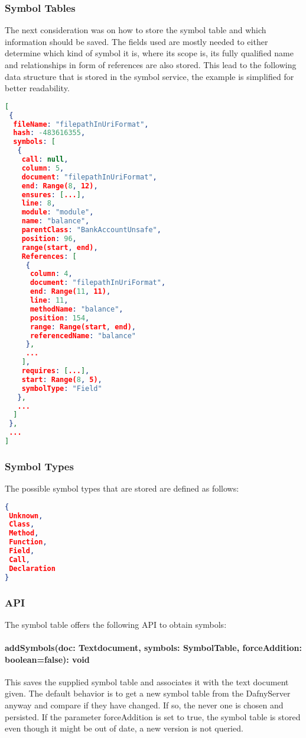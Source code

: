 \subsubsection{Symbol Tables}
The next consideration was on how to store the symbol table and which information should be saved. The fields used are mostly needed to either determine which kind of symbol it is, where its scope is, its fully qualified name and relationships in form of references are also stored. This lead to the following data structure that is stored in the symbol service, the example is simplified for better readability.
\begin{lstlisting}[language=json,firstnumber=1]
[
 {
  fileName: "filepathInUriFormat",
  hash: -483616355,
  symbols: [
   {
    call: null,
    column: 5,
    document: "filepathInUriFormat",
    end: Range(8, 12),
    ensures: [...],
    line: 8,
    module: "module",
    name: "balance",
    parentClass: "BankAccountUnsafe",
    position: 96,
    range(start, end),
    References: [
     {
      column: 4,
      document: "filepathInUriFormat",
      end: Range(11, 11),
      line: 11,
      methodName: "balance",
      position: 154,
      range: Range(start, end),
      referencedName: "balance"
     },
     ...
    ],
    requires: [...],
    start: Range(8, 5),
    symbolType: "Field"
   },
   ...
  ]
 },
 ...
]
\end{lstlisting}
\subsubsection{Symbol Types}
The possible symbol types that are stored are defined as follows:
\begin{lstlisting}[language=json,firstnumber=1]
{
 Unknown,
 Class,
 Method,
 Function,
 Field,
 Call,
 Declaration	
}

\end{lstlisting}
\subsubsection{API}
The symbol table offers the following API to obtain symbols:
\paragraph{addSymbols(doc: Textdocument, symbols: SymbolTable, forceAddition: boolean=false): void} This saves the supplied symbol table and associates it with the text document given. The default behavior is to get a new symbol table from the DafnyServer anyway and compare if they have changed. If so, the never one is chosen and persisted. If the parameter forceAddition is set to true, the symbol table is stored even though it might be out of date, a new version is not queried.
